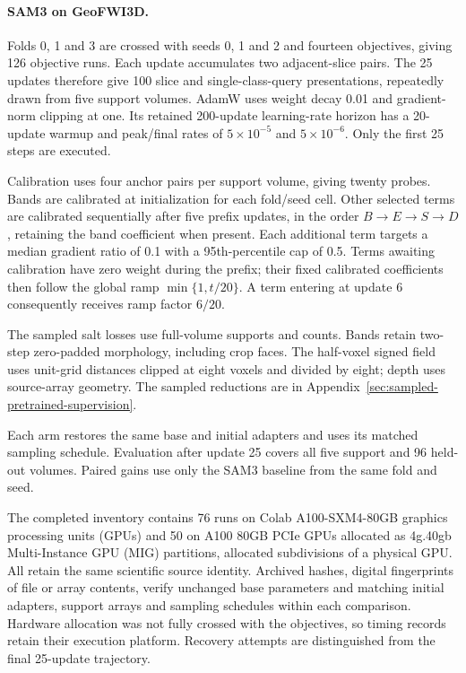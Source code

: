 \documentclass[12pt,a4paper]{article}
\begin{document}
\paragraph{SAM3 on GeoFWI3D.}\label{sec:sam3-methods-details}
Folds 0, 1 and 3 are crossed with seeds 0, 1 and 2 and fourteen
objectives, giving 126 objective runs. Each update accumulates two
adjacent-slice pairs. The 25 updates therefore give 100 slice and
single-class-query presentations, repeatedly drawn from five support
volumes. AdamW uses weight decay 0.01 and gradient-norm clipping at
one. Its retained 200-update learning-rate horizon has a 20-update
warmup and peak/final rates of $5\times10^{-5}$ and $5\times10^{-6}$.
Only the first 25 steps are executed.

Calibration uses four anchor pairs per support volume, giving twenty
probes. Bands are calibrated at initialization for each fold/seed cell.
Other selected terms are calibrated sequentially after five prefix
updates, in the order $B\to E\to S\to D$, retaining the band
coefficient when present. Each additional term targets a median
gradient ratio of 0.1 with a 95th-percentile cap of 0.5. Terms awaiting
calibration have zero weight during the prefix; their fixed calibrated
coefficients then follow the global ramp $\min\{1,t/20\}$. A term
entering at update 6 consequently receives ramp factor $6/20$.

The sampled salt losses use full-volume supports and counts. Bands
retain two-step zero-padded morphology, including crop faces.
The half-voxel signed field uses unit-grid distances clipped at eight
voxels and divided by eight; depth uses source-array geometry.
The sampled reductions are in
Appendix~\ref{sec:sampled-pretrained-supervision}.

Each arm restores the same base and initial adapters and uses its
matched sampling schedule. Evaluation after update 25 covers all five
support and 96 held-out volumes. Paired gains use only the SAM3
baseline from the same fold and seed.

The completed inventory contains 76 runs on Colab A100-SXM4-80GB graphics
processing units (GPUs) and 50 on A100 80GB PCIe GPUs allocated as 4g.40gb
Multi-Instance GPU (MIG) partitions, allocated subdivisions of a physical
GPU. All retain the same scientific source identity. Archived hashes,
digital fingerprints of file or array contents, verify unchanged base
parameters and matching initial adapters, support arrays and sampling
schedules within each comparison. Hardware allocation was not fully crossed
with the objectives, so timing records retain their execution platform.
Recovery attempts are distinguished from the final 25-update trajectory.
\end{document}

